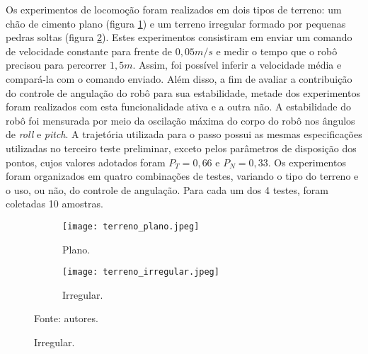 \documentclass[../main.tex]{subfiles}
\begin{document}
  Os experimentos de locomoção foram realizados em dois tipos de terreno: um chão de cimento plano (figura \ref{fig:terreno_plano}) e um terreno irregular formado por pequenas pedras soltas (figura \ref{fig:terreno_irregular}). Estes experimentos consistiram em enviar um comando de velocidade constante para frente de $0,05 m/s$ e medir o tempo que o robô precisou para percorrer $1,5 m$. Assim, foi possível inferir a velocidade média e compará-la com o comando enviado. Além disso, a fim de avaliar a contribuição do controle de angulação do robô para sua estabilidade, metade dos experimentos foram realizados com esta funcionalidade ativa e a outra não. A estabilidade do robô foi mensurada por meio da oscilação máxima do corpo do robô nos ângulos de \textit{roll} e \textit{pitch}. A trajetória utilizada para o passo possui as mesmas especificações utilizadas no terceiro teste preliminar, exceto pelos parâmetros de disposição dos pontos, cujos valores adotados foram $P_T = 0,66$ e $P_N = 0,33$. Os experimentos foram organizados em quatro combinações de testes, variando o tipo do terreno e o uso, ou não, do controle de angulação. Para cada um dos 4 testes, foram coletadas 10 amostras.

  \begin{figure}[!htb]
    \centering
    \caption{Terrenos dos testes.}
    \begin{subfigure}[t]{0.24\textwidth}
      \centering
      \texttt{[image: terreno\_plano.jpeg]}
      \caption{Plano.}
      \label{fig:terreno_plano}
    \end{subfigure}
    \begin{subfigure}[t]{0.24\textwidth}
      \centering
      \texttt{[image: terreno\_irregular.jpeg]}
      \caption{Irregular.}
      \label{fig:terreno_irregular}
    \end{subfigure}
    \vfill
    Fonte: autores.
    \label{fig:terrenos}
  \end{figure}
  
\end{document}
